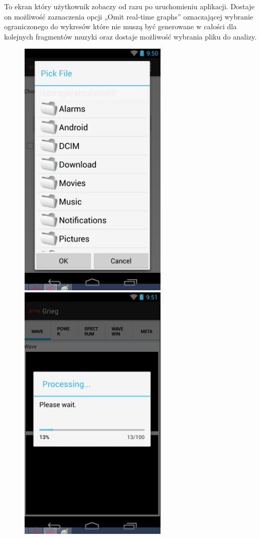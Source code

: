 To ekran który użytkownik zobaczy od razu po uruchomieniu aplikacji. Dostaje on możliwość
zaznaczenia opcji „Omit real-time graphs” oznaczającej wybranie ograniczonego  do
wykresów które nie muszą być generowane w całości dla kolejnych fragmentów muzyki oraz dostaje
możliwość wybrania pliku do analizy.

\begin{figure}[H]
  \centering
  \includegraphics[width=7cm]{images/Pick_file}
  \includegraphics[width=7cm]{images/Processing}
\end{figure}

